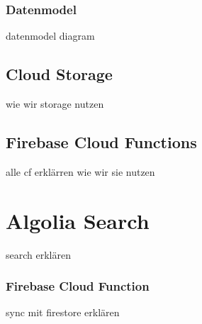 \subsubsection{Datenmodel}
datenmodel diagram
\subsection{Cloud Storage}
wie wir storage nutzen
\subsection{Firebase Cloud Functions}
alle cf erklärren wie wir sie nutzen

\section{Algolia Search}
search erklären
\subsubsection{Firebase Cloud Function}
sync mit firestore erklären

